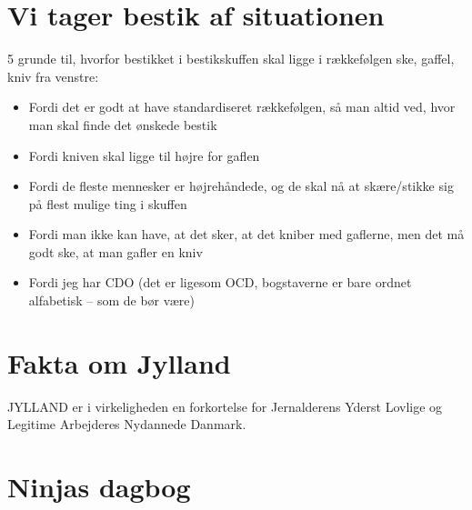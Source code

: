 

\begin{minipage}[b]{0.95\linewidth}
\begin{minipage}[t]{0.47\textwidth}
\vspace{1mm}
\section*{Vi tager bestik af situationen}

5 grunde til, hvorfor bestikket i bestikskuffen skal ligge i rækkefølgen ske, gaffel, kniv fra venstre:

\begin{itemize}
\item Fordi det er godt at have standardiseret rækkefølgen, så man altid ved, hvor man skal finde det ønskede bestik
\item Fordi kniven skal ligge til højre for gaflen
\item Fordi de fleste mennesker er højrehåndede, og de skal nå at skære/stikke sig på flest mulige ting i skuffen
\item Fordi man ikke kan have, at det sker, at det kniber med gaflerne, men det må godt ske, at man gafler en kniv
\item Fordi jeg har CDO (det er ligesom OCD, bogstaverne er bare ordnet alfabetisk – som de bør være)
\end{itemize}

\vspace{-7mm}

\section*{Fakta om Jylland}
JYLLAND er i virkeligheden en forkortelse for Jernalderens Yderst Lovlige og Legitime Arbejderes Nydannede Danmark.

\vspace{-3mm}

\section*{Ninjas dagbog}


\end{minipage}
\end{minipage}
